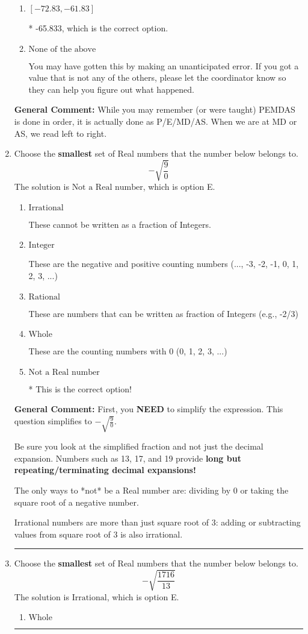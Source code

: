 \documentclass{extbook}[14pt]
\newcommand{\litem}[1]{\item #1

\rule{\textwidth}{0.4pt}}
\begin{document}
\begin{enumerate}
{\begin{enumerate}[label=\Alph*.]
 -55.433, which corresponds to an Order of Operations error: not reading left-to-right for multiplication/division.
\item \( [-72.83, -61.83] \)

* -65.833, which is the correct option.
\item \( \text{None of the above} \)

 You may have gotten this by making an unanticipated error. If you got a value that is not any of the others, please let the coordinator know so they can help you figure out what happened.
\end{enumerate}

\textbf{General Comment:} While you may remember (or were taught) PEMDAS is done in order, it is actually done as P/E/MD/AS. When we are at MD or AS, we read left to right.
}
\litem{
Choose the \textbf{smallest} set of Real numbers that the number below belongs to.
\[ -\sqrt{\frac{9}{0}} \]The solution is \( \text{Not a Real number} \), which is option E.\begin{enumerate}[label=\Alph*.]
\item \( \text{Irrational} \)

These cannot be written as a fraction of Integers.
\item \( \text{Integer} \)

These are the negative and positive counting numbers (..., -3, -2, -1, 0, 1, 2, 3, ...)
\item \( \text{Rational} \)

These are numbers that can be written as fraction of Integers (e.g., -2/3)
\item \( \text{Whole} \)

These are the counting numbers with 0 (0, 1, 2, 3, ...)
\item \( \text{Not a Real number} \)

* This is the correct option!
\end{enumerate}

\textbf{General Comment:} First, you \textbf{NEED} to simplify the expression. This question simplifies to $-\sqrt{\frac{9}{0}}$. 
 
 Be sure you look at the simplified fraction and not just the decimal expansion. Numbers such as 13, 17, and 19 provide \textbf{long but repeating/terminating decimal expansions!} 
 
 The only ways to *not* be a Real number are: dividing by 0 or taking the square root of a negative number. 
 
 Irrational numbers are more than just square root of 3: adding or subtracting values from square root of 3 is also irrational.
}
\litem{
Choose the \textbf{smallest} set of Real numbers that the number below belongs to.
\[ -\sqrt{\frac{1716}{13}} \]The solution is \( \text{Irrational} \), which is option E.\begin{enumerate}[label=\Alph*.]
\item \( \text{Whole} \)


\end{enumerate}}
\end{enumerate}
\end{document}
